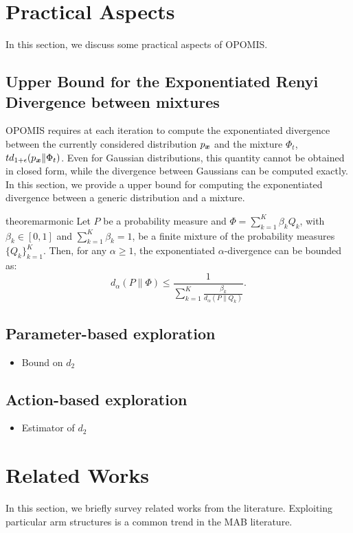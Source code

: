 \documentclass{article}
\makeatletter
\DeclareRobustCommand{\algoname}{OPOMIS\@\xspace}
\makeatother
\begin{document}
\section{Practical Aspects}\label{sec:practical}
In this section, we discuss some practical aspects of \algoname.

\subsection{Upper Bound for the Exponentiated Renyi Divergence between mixtures}
\algoname requires at each iteration to compute the exponentiated \Renyi divergence between the currently considered distribution $p_{\boldsymbol{x}}$ 
and the mixture $\Phi_t$, \ie $td_{1+\epsilon}(p_{\boldsymbol{x}}\|\Phi_t)$. Even for Gaussian distributions, this quantity cannot be obtained in closed form, while
the \Renyi divergence between Gaussians can be computed exactly. In this section, we provide a upper bound for computing the exponentiated \Renyi divergence
between a generic distribution and a mixture.
\begin{restatable}{theorem}{armonic}\label{th:armonic}
	Let $P$ be a probability measure and $\Phi = \sum_{k=1}^K \beta_k Q_k$, with $\beta_k \in [0,1]$ and $\sum_{k=1}^K \beta_k =1$, be a finite mixture of the
	probability measures $\{Q_k\}_{k=1}^K$. Then, for any $\alpha \ge 1$, the exponentiated $\alpha$-\Renyi divergence can be bounded as: 
    \begin{equation*}
        d_{\alpha}(P \| \Phi) \le \frac{1} {\sum_{k=1}^K \frac{ \beta_k}{ d_{\alpha}(P \| Q_k)}}.
    \end{equation*}
\end{restatable}

\subsection{Parameter-based exploration}
\begin{itemize}
	\item Bound on $d_2$
\end{itemize}
\subsection{Action-based exploration}
\begin{itemize}
	\item Estimator of $d_2$
\end{itemize}

\section{Related Works}
In this section, we briefly survey related works from the literature.
Exploiting particular arm structures is a common trend in the MAB literature. 
\end{document}
